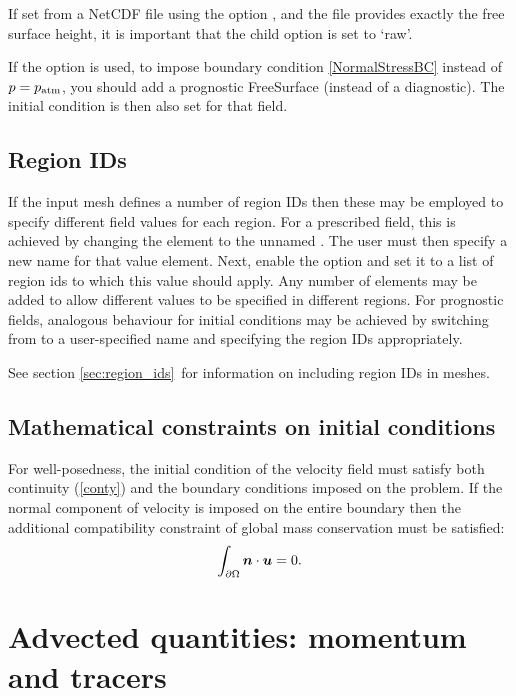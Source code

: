 If set from a NetCDF file using the option , and the file provides exactly the
free surface height, it is important that the child option  is set to `raw'.

If the  option is used, to impose 
boundary condition \eqref{NormalStressBC} instead of $p=p_{\text{atm}}$, you should add a
prognostic FreeSurface (instead of a diagnostic). The initial condition is then
also set for that field.

\subsection{Region IDs}
If the input mesh defines a number of region IDs then these may be employed
to specify different field values for each region. For a prescribed field,
this is achieved by changing the  element to
the unnamed . The user must then specify a new name for
that value element. Next, enable the  
option and set it to a list of region ids to which this value should
apply. Any number of   elements may be added to allow
different values to be specified in different regions. For prognostic
fields, analogous behaviour for initial conditions may be achieved by
switching  from  to a
user-specified name and specifying the region IDs appropriately.

See section \ref{sec:region_ids}\ for information on including region IDs
in meshes.

\subsection{Mathematical constraints on initial conditions}\label{sec:ICs}

For well-posedness, the initial condition of the velocity field must
satisfy both continuity (\ref{conty}) and the boundary conditions
imposed on the problem. If the normal component of velocity is
imposed on the entire boundary then the additional
compatibility constraint of global mass conservation must be
satisfied:
\begin{equation*}
\int_{\partial\Omega}{\mbox{\boldmath$n$}}\cdot{\mbox{\boldmath$u$}}=0.
\end{equation*}

\section{Advected quantities: momentum and tracers}
\label{config:spatial}

